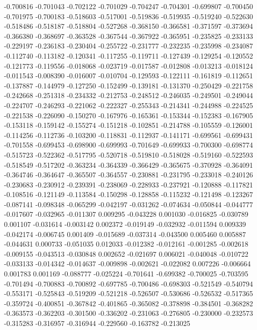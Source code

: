 -0.700816
-0.701043
-0.702122
-0.701029
-0.704247
-0.704301
-0.699807
-0.700450
-0.701975
-0.700183
-0.518603
-0.517001
-0.519836
-0.519935
-0.519240
-0.522630
-0.518486
-0.518187
-0.518804
-0.527268
-0.368150
-0.366581
-0.371597
-0.373694
-0.366380
-0.368697
-0.363528
-0.367544
-0.367922
-0.365951
-0.235825
-0.233133
-0.229197
-0.236183
-0.230404
-0.255722
-0.231777
-0.232235
-0.235998
-0.234087
-0.112740
-0.113182
-0.120341
-0.117255
-0.119711
-0.127439
-0.129254
-0.120552
-0.121773
-0.119556
-0.018068
-0.023719
-0.017587
-0.012808
-0.013213
-0.018124
-0.011543
-0.008390
-0.016007
-0.010704
-0.129593
-0.122111
-0.161819
-0.112651
-0.137887
-0.144979
-0.127250
-0.152499
-0.139181
-0.131370
-0.250429
-0.221758
-0.242668
-0.251318
-0.234332
-0.212753
-0.248512
-0.246035
-0.249501
-0.249044
-0.224707
-0.246293
-0.221062
-0.222327
-0.255343
-0.214341
-0.244988
-0.224525
-0.221538
-0.226090
-0.150270
-0.167976
-0.165361
-0.153344
-0.152383
-0.167905
-0.153118
-0.159142
-0.155274
-0.151218
-0.102851
-0.214788
-0.105559
-0.126001
-0.114256
-0.112736
-0.103200
-0.118831
-0.112937
-0.141171
-0.699561
-0.699431
-0.701558
-0.699453
-0.698900
-0.699993
-0.701649
-0.699933
-0.700300
-0.698774
-0.515723
-0.522362
-0.517795
-0.520718
-0.519810
-0.518028
-0.519160
-0.522593
-0.518549
-0.517202
-0.363234
-0.364339
-0.366429
-0.365675
-0.370928
-0.364091
-0.364746
-0.364647
-0.365507
-0.364557
-0.230881
-0.231795
-0.233018
-0.240126
-0.230683
-0.230912
-0.239391
-0.238069
-0.228933
-0.237921
-0.120888
-0.117821
-0.108516
-0.121149
-0.113584
-0.150298
-0.128858
-0.115232
-0.121498
-0.123267
-0.087141
-0.098348
-0.065299
-0.042197
-0.031262
-0.074634
-0.050844
-0.044777
-0.017607
-0.032965
-0.011307
0.009295
-0.043228
0.001030
-0.016825
-0.030789
0.001107
-0.031614
-0.003142
0.002372
-0.019149
-0.032932
-0.011594
0.009339
-0.042174
-0.006745
0.001409
-0.015689
-0.037314
-0.043500
0.005460
0.005887
-0.044631
0.000733
-0.051035
0.012033
-0.012382
-0.012161
-0.001285
-0.002618
-0.009155
-0.043513
-0.030848
0.002652
-0.021697
0.006021
-0.040048
-0.010722
-0.033133
-0.014342
-0.014637
-0.009898
-0.002621
-0.022082
0.007226
-0.006664
0.001783
0.001169
-0.088777
-0.025224
-0.701641
-0.699382
-0.700025
-0.703595
-0.701494
-0.700883
-0.700892
-0.697785
-0.700486
-0.698303
-0.521549
-0.540794
-0.553171
-0.525843
-0.519209
-0.521218
-0.526507
-0.530686
-0.526532
-0.517365
-0.359724
-0.400851
-0.367842
-0.401865
-0.365082
-0.378898
-0.384501
-0.368282
-0.363573
-0.362203
-0.301500
-0.336202
-0.231063
-0.276805
-0.230000
-0.232573
-0.315283
-0.316957
-0.316944
-0.229560
-0.163782
-0.213025
